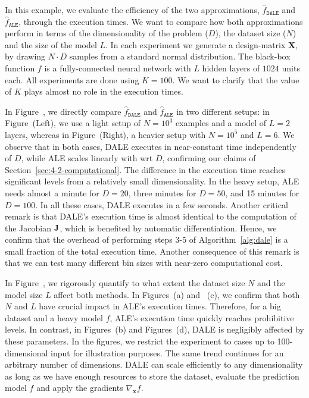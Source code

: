 \documentclass[wcp]{jmlr}
\newcommand{\dale}{\hat{f}_{\mathtt{DALE}}}
\newcommand{\xb}{\mathbf{x}} \newcommand{\R}{\mathbb{R}}
\begin{document}
In this example, we evaluate the efficiency of the two approximations,
\(\dale\) and \(\hat{f}_{\mathtt{ALE}}\), through the
execution times. We want to compare how both approximations perform in
terms of the dimensionality of the problem (\(D\)), the dataset size
(\(N\)) and the size of the model \(L\). In each experiment we
generate a design-matrix \( \mathbf{X} \), by drawing \( N \cdot D \)
samples from a standard normal distribution. The black-box function
\(f \) is a fully-connected neural network with \(L\) hidden layers of
\( 1024 \) units each. All experiments are done using \(K=100\). We
want to clarify that the value of \(K\) plays almost no role in the
execution times.

In Figure~, we directly compare
\(\dale\) and \(\hat{f}_{\mathtt{ALE}}\) in two different
setups: in Figure~(Left), we use a light setup
of \(N=10^3\) examples and a model of \(L=2\) layers, whereas in
Figure~(Right), a heavier setup with
\(N=10^5\) and \(L=6\). We observe that in both cases, DALE executes
in near-constant time independently of \(D\), while ALE scales
linearly with wrt \(D\), confirming our claims of
Section~\ref{sec:4-2-computational}. The difference in the execution
time reaches significant levels from a relatively small
dimensionality. In the heavy setup, ALE needs almost a minute for
\(D=20\), three minutes for \(D=50\), and 15 minutes for \(D=100\). In
all these cases, DALE executes in a few seconds. Another critical
remark is that DALE's execution time is almost identical to the
computation of the Jacobian \( \mathbf{J} \), which is benefited by
automatic differentiation. Hence, we confirm that the overhead of
performing steps 3-5 of Algorithm~\ref{alg:dale} is a small fraction
of the total execution time. Another consequence of this remark is
that we can test many different bin sizes with near-zero computational
cost.

In Figure~, we rigorously quantify to what
extent the dataset size \(N\) and the model size \(L\) affect both
methods. In Figures~(a) and
~(c), we confirm that both \(N\) and \(L\)
have crucial impact in ALE's execution times. Therefore, for a big
dataset and a heavy model \(f\), ALE's execution time quickly reaches
prohibitive levels. In contrast, in
Figures~(b) and
Figures~(d), DALE is negligibly affected by
these parameters. In the figures, we restrict the experiment to cases
up to 100-dimensional input for illustration purposes. The same trend
continues for an arbitrary number of dimensions. DALE can scale
efficiently to any dimensionality as long as we have enough resources
to store the dataset, evaluate the prediction model \(f\) and apply
the gradients \(\nabla_{\xb}f\).
\end{document}
